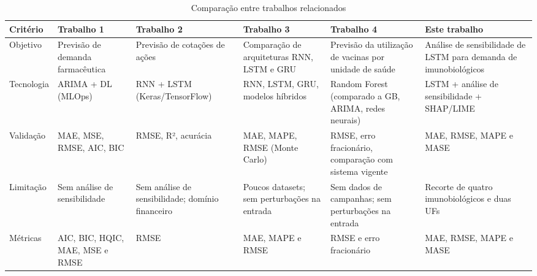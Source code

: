 \documentclass[
    12pt,                %
    openright,           %
    oneside,             %
    a4paper,             %
    english,             %
    brazil               %
]{abntex2}
\begin{document}
\begin{table}[htb]
    \centering
    \caption{Comparação entre trabalhos relacionados}
    \label{tab:trabalhos_relacionados}

    \footnotesize
    \begin{tabularx}{\textwidth}{>{\raggedright\arraybackslash}p{1.9cm}|>{\raggedright\arraybackslash}X|>{\raggedright\arraybackslash}X|>{\raggedright\arraybackslash}X|>{\raggedright\arraybackslash}X|>{\raggedright\arraybackslash}X}
        \toprule
        \textbf{Critério} & \textbf{Trabalho 1} & \textbf{Trabalho 2} & \textbf{Trabalho 3} & \textbf{Trabalho 4} & \textbf{Este trabalho} \\
        \midrule
        Objetivo
        & Previsão de demanda farmacêutica
        & Previsão de cotações de ações
        & Comparação de arquiteturas RNN, LSTM e GRU
        & Previsão da utilização de vacinas por unidade de saúde
        & Análise de sensibilidade de LSTM para demanda de imunobiológicos \\

        \midrule

        Tecnologia
        & ARIMA + DL (MLOps)
        & RNN + LSTM (Keras/TensorFlow)
        & RNN, LSTM, GRU, modelos híbridos
        & Random Forest (comparado a GB, ARIMA, redes neurais)
        & LSTM + análise de sensibilidade + SHAP/LIME \\

        \midrule

        Validação
        & MAE, MSE, RMSE, AIC, BIC
        & RMSE, R², acurácia
        & MAE, MAPE, RMSE (Monte Carlo)
        & RMSE, erro fracionário, comparação com sistema vigente
        & MAE, RMSE, MAPE e MASE \\

        \midrule

        Limitação
        & Sem análise de sensibilidade
        & Sem análise de sensibilidade; domínio financeiro
        & Poucos datasets; sem perturbações na entrada
        & Sem dados de campanhas; sem perturbações na entrada
        & Recorte de quatro imunobiológicos e duas UFs \\

        \midrule
        Métricas
        & AIC, BIC, HQIC, MAE, MSE e RMSE
        & RMSE
        & MAE, MAPE e RMSE
        & RMSE e erro fracionário
        & MAE, RMSE, MAPE e MASE \\

        \bottomrule
    \end{tabularx}

\end{table}
\end{document}
